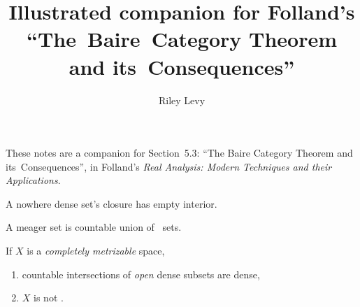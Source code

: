 \documentclass{scrartcl}
\author{Riley Levy}
\title{\color[gray]{.3}Illustrated companion for Folland's ``The~Baire~Category Theorem and its~Consequences''}
\begin{document}
\maketitle{}
These notes are a companion for Section~5.3: ``The Baire Category Theorem and its~Consequences'', in Folland's \emph{Real Analysis: Modern Techniques and their Applications}.
\begin{defn}\label{nowhere-dense}
  A nowhere dense set's closure has empty interior.
\end{defn}
\begin{defn}[meager]\label{meager}
  A meager set is countable union of ~sets. \cite[pg.\ 161]{folland}
\end{defn}
\begin{theorem}\label{baire category}
  If \(X\) is a \emph{completely metrizable} space,
  \begin{enumerate}
  \item countable intersections of \emph{open} dense subsets are dense,
  \item \(X\) is not .
  \end{enumerate}
\end{theorem}
\end{document}
